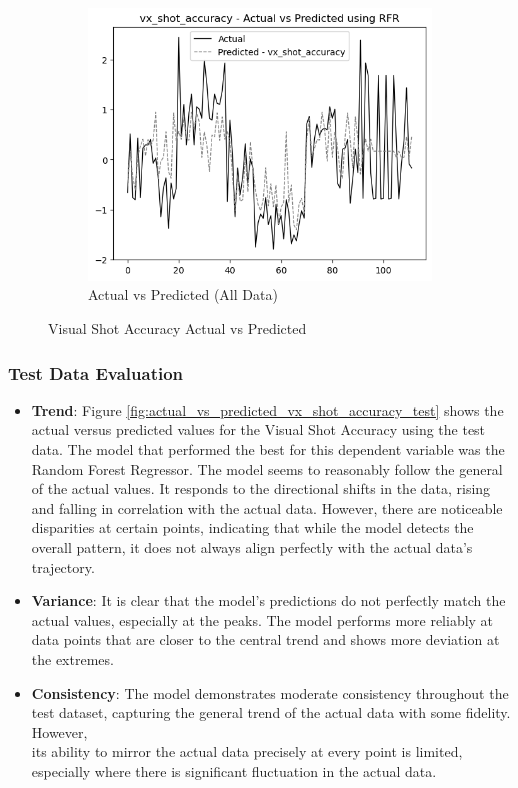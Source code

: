 \begin{figure}[htbp]
\begin{subfigure}[b]{0.49\textwidth}
        \includegraphics[width=\textwidth]{images/regressionCharts/all_data_visual_shot_accuracy.png}
        \caption{Actual vs Predicted (All Data)}
        \label{fig:actual_vs_predicted_vx_shot_accuracy_all_data}
    \end{subfigure}
    \caption{Visual Shot Accuracy Actual vs Predicted}
    \label{fig:visual_shot_accuracy_comparison}
\end{figure}

\subsubsection*{Test Data Evaluation}

\begin{itemize}
    \item \textbf{Trend}: Figure \ref{fig:actual_vs_predicted_vx_shot_accuracy_test} shows the actual versus predicted values for the Visual Shot Accuracy using the test data. The model that performed
          the best for this dependent variable was the Random Forest Regressor. The model seems to reasonably follow the general of the actual values. It responds to the directional shifts in the data,
          rising and falling in correlation with the actual data. However, there are noticeable disparities at certain points, indicating that while the model detects the overall pattern, it does not always align
          perfectly with the actual data's trajectory.
    \item \textbf{Variance}: It is clear that the model's predictions do not perfectly match the actual values, especially at the peaks. The model performs
          more reliably at data points that are closer to the central trend and shows more deviation at the extremes.
    \item \textbf{Consistency}: The model demonstrates moderate consistency throughout the test dataset, capturing the general trend of the actual data with some fidelity. However, \\
          its ability to mirror the actual data precisely at every point is limited, especially where there is significant fluctuation in the actual data.

\end{itemize}

